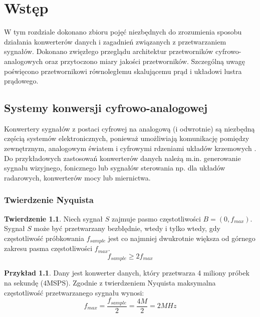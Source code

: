 \documentclass[10pt,a4paper,twoside]{report}
\theoremstyle{definition}
\theoremstyle{definition}
\theoremstyle{definition}
\newtheorem{przyklad}{Przykład}[section]
\theoremstyle{definition}
\newtheorem{twierdzenie}{Twierdzenie}[section]
\theoremstyle{definition}
\begin{document}
	\chapter{Wstęp}
	{	W tym rozdziale dokonano zbioru pojęć niezbędnych do zrozumienia sposobu działania konwerterów danych i zagadnień związanych z przetwarzaniem sygnałów. Dokonano zwięzłego przeglądu architektur przetworników cyfrowo-analogowych oraz przytoczono miary jakości przetworników. Szczególną uwagę poświęcono przetwornikowi równoległemu skalującemu prąd i układowi lustra prądowego.}
	

	\section{Systemy konwersji cyfrowo-analogowej}
	{	Konwertery sygnałów z postaci cyfrowej na analogową (i odwrotnie) są niezbędną częścią systemów elektronicznych, ponieważ umożliwiają komunikację pomiędzy zewnętrznym, analogowym światem i cyfrowymi rdzeniami układów krzemowych \cite{integconv}. Do przykładowych zastosowań konwerterów danych należą m.in. generowanie sygnału wizyjnego, fonicznego lub sygnałów sterowania np. dla układów radarowych, konwerterów mocy lub miernictwa. }
	
	\subsection{Twierdzenie Nyquista}
	
	\begin{twierdzenie}{Niech sygnał $S$ zajmuje pasmo częstotliwości $B =\left(0, f_{max}\right) $. Sygnał $S$ może być przetwarzany bezbłędnie, wtedy i tylko wtedy, gdy częstotliwość próbkowania $f_{sample}$ jest co najmniej dwukrotnie większa od górnego zakresu pasma częstotliwości $f_{max}$. }
	\begin{equation}
		f_{sample} \ge 2 f_{max}
	\end{equation}

	\end{twierdzenie}
	
	\begin{przyklad}{Dany jest konwerter danych, który przetwarza 4 miliony próbek na sekundę ($4$MSPS). Zgodnie z twierdzeniem Nyquista maksymalna częstotliwość przetwarzanego sygnału wynosi:}
		\begin{equation}
			f_{max} = \frac{f_{sample}}{2} = \frac{4M}{2} = 2MHz
		\end{equation}
	\end{przyklad}
	
\end{document}
